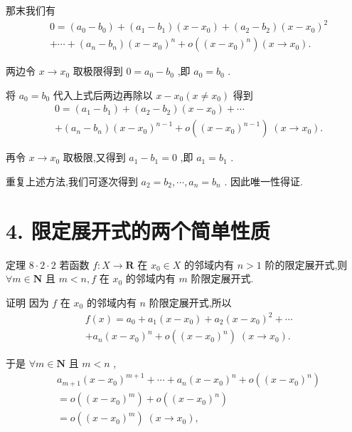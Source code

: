 那末我们有
\begin{align*}
	&0 = \left( {{a}_{0} - {b}_{0}}\right)  + \left( {{a}_{1} - {b}_{1}}\right) \left( {x - {x}_{0}}\right)  + \left( {{a}_{2} - {b}_{2}}\right) {\left( x - {x}_{0}\right) }^{2}\\
	&+ \cdots  + \left( {{a}_{n} - {b}_{n}}\right) {\left( x - {x}_{0}\right) }^{n} + o\left( {\left( x - {x}_{0}\right) }^{n}\right) \left( {x \rightarrow  {x}_{0}}\right) .
\end{align*}

两边令 $x \rightarrow  {x}_{0}$ 取极限得到 $0 = {a}_{0} - {b}_{0}$ ,即 ${a}_{0} = {b}_{0}$ .

将 ${a}_{0} = {b}_{0}$ 代入上式后两边再除以 $x - {x}_{0}\left( {x \neq  {x}_{0}}\right)$ 得到
\begin{align*}
	&0 = \left( {{a}_{1} - {b}_{1}}\right)  + \left( {{a}_{2} - {b}_{2}}\right) \left( {x - {x}_{0}}\right)  + \cdots\\
	&+ \left( {{a}_{n} - {b}_{n}}\right) {\left( x - {x}_{0}\right) }^{n - 1} + o\left( {\left( x - {x}_{0}\right) }^{n - 1}\right) \;\left( {x \rightarrow  {x}_{0}}\right) .
\end{align*}

再令 $x \rightarrow  {x}_{0}$ 取极限,又得到 ${a}_{1} - {b}_{1} = 0$ ,即 ${a}_{1} = {b}_{1}$ .

重复上述方法,我们可逐次得到 ${a}_{2} = {b}_{2},\cdots ,{a}_{n} = {b}_{n}$ . 因此唯一性得证.

\section*{4. 限定展开式的两个简单性质}

定理 $8 \cdot  2 \cdot  2$ 若函数 $f : X \rightarrow  \mathbf{R}$ 在 ${x}_{0} \in  X$ 的邻域内有 $n > 1$ 阶的限定展开式,则 $\forall m \in  \mathbf{N}$ 且 $m < n,f$ 在 ${x}_{0}$ 的邻域内有 $m$ 阶限定展开式.

证明 因为 $f$ 在 ${x}_{0}$ 的邻域内有 $n$ 阶限定展开式,所以
\begin{align*}
	&f\left( x\right)  = {a}_{0} + {a}_{1}\left( {x - {x}_{0}}\right)  + {a}_{2}{\left( x - {x}_{0}\right) }^{2} + \cdots\\
	&+ {a}_{n}{\left( x - {x}_{0}\right) }^{n} + o\left( {\left( x - {x}_{0}\right) }^{n}\right) \;\left( {x \rightarrow  {x}_{0}}\right) .
\end{align*}

于是 $\forall m \in  \mathbf{N}$ 且 $m < n$ ,
\begin{align*}
	&{a}_{m + 1}{\left( x - {x}_{0}\right) }^{m + 1} + \cdots  + {a}_{n}{\left( x - {x}_{0}\right) }^{n} + o\left( {\left( x - {x}_{0}\right) }^{n}\right)\\
	&= o\left( {\left( x - {x}_{0}\right) }^{m}\right)  + o\left( {\left( x - {x}_{0}\right) }^{n}\right)\\
	&= o\left( {\left( x - {x}_{0}\right) }^{m}\right) \;\left( {x \rightarrow  {x}_{0}}\right) ,
\end{align*}

